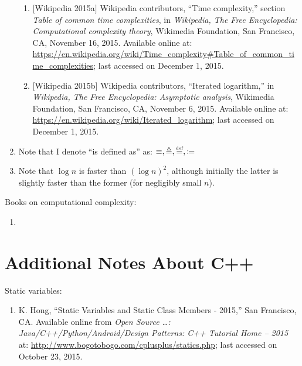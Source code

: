 \begin{enumerate}
\begin{enumerate}
	\item $[$Wikipedia 2015a$]$ Wikipedia contributors, ``Time complexity,'' section {\it Table of common time complexities}, in {\it Wikipedia, The Free Encyclopedia: Computational complexity theory}, Wikimedia Foundation, San Francisco, CA, November 16, 2015. Available online at: \url{https://en.wikipedia.org/wiki/Time_complexity#Table_of_common_time_complexities}; last accessed on December 1, 2015.
	\item $[$Wikipedia 2015b$]$ Wikipedia contributors, ``Iterated logarithm,'' in {\it Wikipedia, The Free Encyclopedia: Asymptotic analysis}, Wikimedia Foundation, San Francisco, CA, November 6, 2015. Available online at: \url{https://en.wikipedia.org/wiki/Iterated_logarithm}; last accessed on December 1, 2015.
	\end{enumerate}
\item Note that I denote ``is defined as'' as: $\equiv, \triangleq, \stackrel{\text{\tiny def}}{=}, \coloneqq$
\item Note that $\log n$ is faster than $(\log n)^{2}$, although initially the latter is slightly faster than the former (for negligibly small $n$).
\end{enumerate}


Books on computational complexity: \vspace{-0.3cm}
\begin{enumerate} \itemsep -4pt
\item \cite[pp.10--11 ]{Josuttis2012}
\end{enumerate}


\section{Additional Notes About C++}
\label{sec:AdditionalNotesAboutCpp}


Static variables: \vspace{-0.3cm}
\begin{enumerate} \itemsep -4pt
\item K. Hong, ``Static Variables and Static Class Members - 2015,'' San Francisco, CA. Available online from {\it Open Source \dots: Java/C++/Python/Android/Design Patterns: C++ Tutorial Home -- 2015} at: \url{http://www.bogotobogo.com/cplusplus/statics.php}; last accessed on October 23, 2015.
\end{enumerate}




